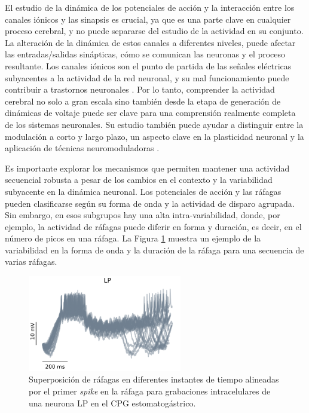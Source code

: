 El estudio de la dinámica de los potenciales de acción y la interacción entre los canales iónicos y las sinapsis es crucial, ya que es una parte clave en cualquier proceso cerebral, y no puede separarse del estudio de la actividad en su conjunto. La alteración de la dinámica de estos canales a diferentes niveles, puede afectar las entradas/salidas sinápticas, cómo se comunican las neuronas y el proceso resultante. Los canales iónicos son el punto de partida de las señales eléctricas subyacentes a la actividad de la red neuronal, y su mal funcionamiento puede contribuir a trastornos neuronales \parencite{kecskes_editorial_2023}. Por lo tanto, comprender la actividad cerebral no solo a gran escala sino también desde la etapa de generación de dinámicas de voltaje puede ser clave para una comprensión realmente completa de los sistemas neuronales. Su estudio también puede ayudar a distinguir entre la modulación a corto y largo plazo, un aspecto clave en la plasticidad neuronal y la aplicación de técnicas neuromoduladoras \parencite{chambers_light-activated_2008,burke_modulation_2019}.

Es importante explorar los mecanismos que permiten mantener una actividad secuencial robusta a pesar de los cambios en el contexto y la variabilidad subyacente en la dinámica neuronal. Los potenciales de acción y las ráfagas pueden clasificarse según su forma de onda y la actividad de disparo agrupada. Sin embargo, en esos subgrupos hay una alta intra-variabilidad, donde, por ejemplo, la actividad de ráfagas puede diferir en forma y duración, es decir, en el número de picos en una ráfaga. La Figura \ref{fig:burst variability spanish} muestra un ejemplo de la variabilidad en la forma de onda y la duración de la ráfaga para una secuencia de varias ráfagas.

\begin{figure}[htb!]
	\centering
	\includegraphics[width=0.6\textwidth]{img/intro/burst_variability.png}
	\caption{Superposición de ráfagas en diferentes instantes de tiempo alineadas por el primer \textit{spike} en la ráfaga para grabaciones intracelulares de una neurona LP en el CPG estomatogástrico.}
	\label{fig:burst variability spanish}
\end{figure}

